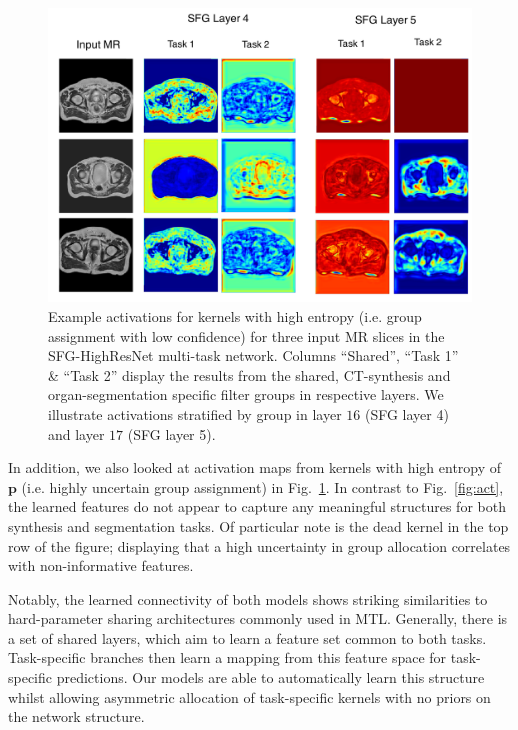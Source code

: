 \begin{figure}[ht]
	\centering
		\vspace{-2mm}
	\includegraphics[width=\linewidth]{chapter_6/figures_supp/uncertain_activation.pdf}
		\vspace{-2mm}
	\caption{\footnotesize Example activations for kernels with high entropy (i.e. group assignment with low confidence) for three input MR slices in the SFG-HighResNet multi-task network.  Columns ``Shared'', ``Task 1'' \& ``Task 2'' display the results from the shared, CT-synthesis and organ-segmentation specific filter groups in respective layers. We illustrate activations stratified by group in layer $16$ (SFG layer 4) and layer $17$ (SFG layer 5). }
	\label{fig:act_unc}
\end{figure}

In addition, we also looked at activation maps from kernels with high entropy of $\mathbf{p}$ (i.e. highly uncertain group assignment) in Fig.~\ref{fig:act_unc}. In contrast to Fig.~\ref{fig:act}, the learned features do not appear to capture any meaningful structures for both synthesis and segmentation tasks. Of particular note is the dead kernel in the top row of the figure; displaying that a high uncertainty in group allocation correlates with non-informative features. 

Notably, the learned connectivity of both models shows striking similarities to hard-parameter sharing architectures commonly used in MTL. Generally, there is a set of shared layers, which aim to learn a feature set common to both tasks. Task-specific branches then learn a mapping from this feature space for task-specific predictions. Our models are able to automatically learn this structure whilst allowing asymmetric allocation of task-specific kernels with no priors on the network structure.

